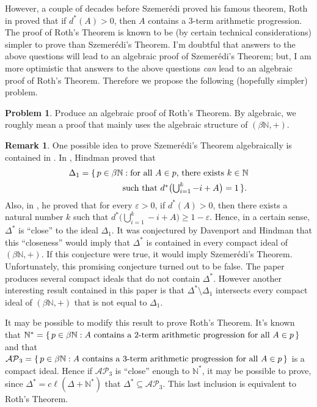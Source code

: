 \documentclass[12pt]{article}
\theoremstyle{plain}
\theoremstyle{definition}
\newtheorem{rmk}[thm]{Remark}
\newtheorem{prob}[thm]{Problem}
\newcommand{\bbN}{\mathbb{N}}
\begin{document}
However, a couple of decades before Szemer\'{e}di proved his famous
theorem, Roth in \cite{Roth:1953fk} proved that if $d^*(A) > 0$, then
$A$ contains a 3-term arithmetic progression. 
The proof of Roth's Theorem is known to be (by certain technical
considerations) simpler to prove than Szemer\'{e}di's Theorem. 
I'm doubtful that answers to the above questions will lead to an
algebraic proof of Szemer\'{e}di's Theorem; but, I am more optimistic that
answers to the above questions \textsl{can} lead to an algebraic proof
of Roth's Theorem.
Therefore we propose the following (hopefully simpler) problem.
\begin{prob}
  Produce an algebraic proof of Roth's Theorem.
  By algebraic, we roughly mean a proof that mainly uses the
  algebraic structure of $(\beta\bbN, +)$. 
\end{prob}
\begin{rmk}
  One possible idea to prove Szemer\'{e}di's Theorem algebraically is
  contained in \cite{Davenport:1987uq}.  
  In \cite[Theorem 3.8]{Hindman:1982zr}, Hindman proved that 
  \begin{align*}
    \Delta_1 &= \{\, p \in \beta\bbN: \hbox{for all $A \in p$, there
      exists $k \in \bbN$} \\
      &\hspace{5em}\hbox{such that $d^*\bigl(\bigcup_{i=1}^k
        -i+A\bigr) = 1$} \,\}.
  \end{align*}
  Also, in \cite[Theorem 3.8]{Hindman:1982fk}, he proved that for
  every $\varepsilon >0$, if $d^*(A) > 0$, then there exists a natural
  number $k$ such that $d^*\bigl(\bigcup_{i=1}^k -i+A \bigr) \ge 1 -
  \varepsilon$. 
  Hence, in a certain sense, $\Delta^*$ is ``close'' to the ideal
  $\Delta_1$. 
  It was conjectured by Davenport and Hindman that this ``closeness''
  would imply that $\Delta^*$ is contained in every compact ideal of
  $(\beta\bbN, +)$. 
  If this conjecture were true, it would imply Szemer\'{e}di's
  Theorem. 
  Unfortunately, this promising conjecture turned out to be
  false. 
  The paper \cite{Davenport:1987uq} produces several compact ideals
  that do not contain $\Delta^*$. 
  However another interesting result contained in this paper is that
  $\Delta^*\setminus\Delta_1$ intersects every compact ideal of
  $(\beta\bbN, +)$ that is not equal to $\Delta_1$.

  It may be possible to modify this result to prove Roth's Theorem. 
  It's known that $\bbN^* = \{\, p \in \beta\bbN : \hbox{$A$ contains
    a 2-term arithmetic progression for all $A \in p$} \,\}$ and that
  $\mathcal{AP}_3 = \{\, p \in \beta\bbN : \hbox{$A$ contains a }
  \hbox{3-term arithmetic progression for all $A \in p$} \,\}$ is a
  compact ideal.
  Hence if $\mathcal{AP}_3$ is ``close'' enough to $\bbN^*$, it may be
  possible to prove, since $\Delta^* = c\ell(\Delta+\bbN^*)$ that
  $\Delta^* \subseteq  \mathcal{AP}_3$. 
  This last inclusion is equivalent to Roth's Theorem.
\end{rmk}
\end{document}
